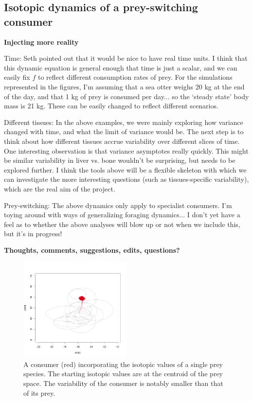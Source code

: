 \documentclass[11pt]{article}
\begin{document}
\subsection{Isotopic dynamics of a prey-switching consumer}


{\bf Injecting more reality} 

Time: Seth pointed out that it would be nice to have real time units.
I think that this dynamic equation is general enough that time is just a scalar, and we can easily fix $f$ to reflect different consumption rates of prey.
For the simulations represented in the figures, I'm assuming that a sea otter weighs 20 kg at the end of the day, and that 1 kg of prey is consumed per day... so the `steady state' body mass is 21 kg.
These can be easily changed to reflect different scenarios.

Different tissues: In the above examples, we were mainly exploring how variance changed with time, and what the limit of variance would be.
The next step is to think about how different tissues accrue variability over different slices of time.
One interesting observation is that variance asymptotes really quickly.
This might be similar variability in liver vs. bone wouldn't be surprising, but needs to be explored further.
I think the tools above will be a flexible skeleton with which we can investigate the more interesting questions (such as tissues-specific variability), which are the real aim of the project.

Prey-switching: The above dynamics only apply to specialist consumers. I'm toying around with ways of generalizing foraging dynamics... I don't yet have a feel as to whether the above analyses will blow up or not when we include this, but it's in progress!

{\bf Thoughts, comments, suggestions, edits, questions?}


\begin{figure}[h!]
   \centering
   \includegraphics[width=0.5\textwidth]{fig_bivariate.png}
      \caption{
      A consumer (red) incorporating the isotopic values of a single prey species. The starting isotopic values are at the centroid of the prey space. The variability of the consumer is notably smaller than that of its prey.
      }
      \label{fig_bivariate}
\end{figure}
\end{document}
